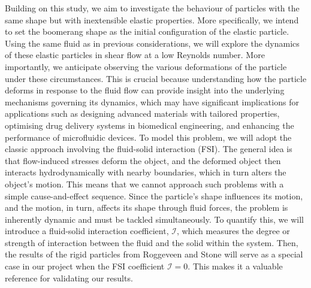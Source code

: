 \documentclass[12pt,MSc,twoside]{muthesis_2020}
\begin{document}
Building on this study, we aim to investigate the behaviour of particles with the same shape but with inextensible elastic properties. More specifically, we intend to set the boomerang shape as the initial configuration of the elastic particle. Using the same fluid as in previous considerations, we will explore the dynamics of these elastic particles in shear flow at a low Reynolds number. More importantly, we anticipate observing the various deformations of the particle under these circumstances. This is crucial because understanding how the particle deforms in response to the fluid flow can provide insight into the underlying mechanisms governing its dynamics, which may have significant implications for applications such as designing advanced materials with tailored properties, optimising drug delivery systems in biomedical engineering, and enhancing the performance of microfluidic devices. To model this problem, we will adopt the classic approach involving the fluid-solid interaction (FSI). The general idea is that flow-induced stresses deform the object, and the deformed object then interacts hydrodynamically with nearby boundaries, which in turn alters the object's motion. This means that we cannot approach such problems with a simple cause-and-effect sequence. Since the particle's shape influences its motion, and the motion, in turn, affects its shape through fluid forces, the problem is inherently dynamic and must be tackled simultaneously. To quantify this, we will introduce a fluid-solid interaction coefficient, $\mathcal{I}$, which measures the degree or strength of interaction between the fluid and the solid within the system. Then, the results of the rigid particles from Roggeveen and Stone \cite{roggeveen2022motion} will serve as a special case in our project when the FSI coefficient $\mathcal{I}=0$. This makes it a valuable reference for validating our results.
\end{document}
